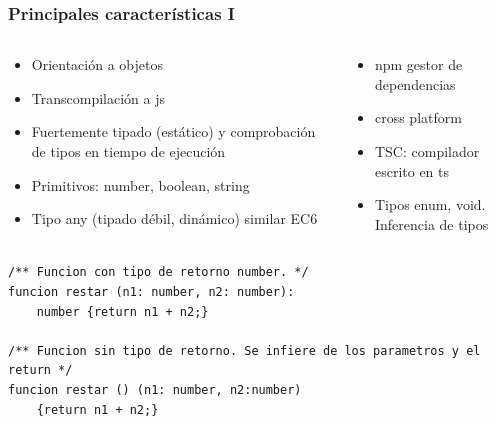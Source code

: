 \documentclass{beamer}
\begin{document}
\begin{frame}[fragile]
\frametitle{Principales características I}

\small
\begin{columns}[T]
	\begin{column}[T]{.5\textwidth} %
		
		\begin{itemize}
			\item Orientación a objetos
			\item Transcompilación a js 
			\item Fuertemente tipado (estático) y comprobación de tipos en tiempo de ejecución
			\item Primitivos: number, boolean, string
			\item Tipo any (tipado débil, dinámico) similar EC6
		\end{itemize}
		
		
	\end{column}
	\begin{column}[T]{0.5\textwidth} %
		\begin{itemize}
			\item npm gestor de dependencias
			\item cross platform
			\item TSC: compilador escrito en ts
			\item Tipos enum, void. Inferencia de tipos
		\end{itemize}

	\end{column}
\end{columns}

\tiny
 \begin{lstlisting}[style=customc, frame=single]
/** Funcion con tipo de retorno number. */
funcion restar (n1: number, n2: number): 
	number {return n1 + n2;}
	
/** Funcion sin tipo de retorno. Se infiere de los parametros y el return */
funcion restar () (n1: number, n2:number)
	{return n1 + n2;}
\end{lstlisting}


\end{frame}
\end{document}
